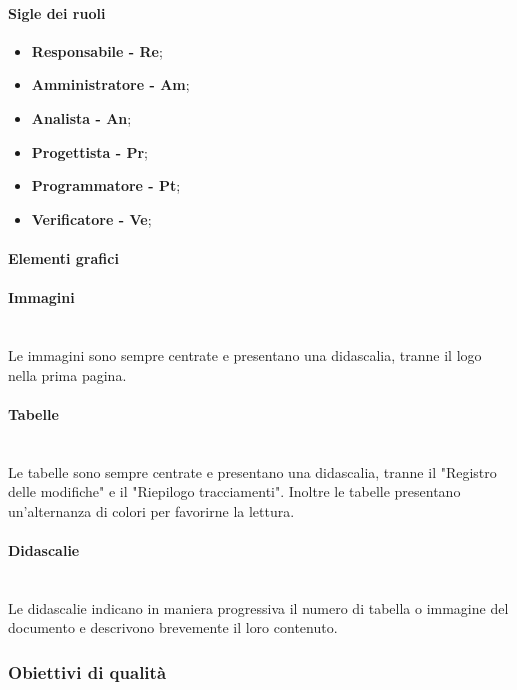             \paragraph*{Sigle dei ruoli}
                \begin{itemize}
                    \item \textbf{Responsabile - Re};
                    \item \textbf{Amministratore - Am};
                    \item \textbf{Analista - An};
                    \item \textbf{Progettista - Pr};
                    \item \textbf{Programmatore - Pt};
                    \item \textbf{Verificatore - Ve};
                \end{itemize}
        \paragraph{Elementi grafici}
            \paragraph*{Immagini}\mbox{}\\ [1mm]
                Le immagini sono sempre centrate e presentano una didascalia, tranne il logo nella prima pagina.
            \paragraph*{Tabelle}\mbox{}\\ [1mm]
                Le tabelle sono sempre centrate e presentano una didascalia, tranne il "Registro delle modifiche" e il "Riepilogo tracciamenti".
                Inoltre le tabelle presentano un'alternanza di colori per favorirne la lettura.
            \paragraph*{Didascalie}\mbox{}\\ [1mm]
                Le didascalie indicano in maniera progressiva il numero di tabella o immagine del documento e descrivono brevemente il loro contenuto.

       \subsubsection{Obiettivi di qualità}
